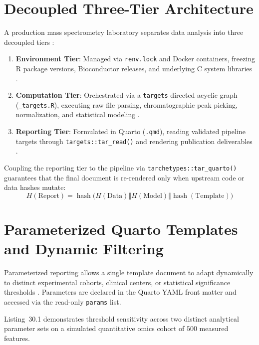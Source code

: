 \documentclass[11pt,twoside,openright]{book}
\begin{document}
\FloatBarrier
\section{Decoupled Three-Tier Architecture}
\label{sec:three_tier}

A production mass spectrometry laboratory separates data analysis into three decoupled tiers \cite{peng2011reproducible, landau2021targets}:
\begin{enumerate}
\item \textbf{Environment Tier}: Managed via \texttt{renv.lock} and Docker containers, freezing R package versions, Bioconductor releases, and underlying C system libraries \cite{ushey2024renv}.
\item \textbf{Computation Tier}: Orchestrated via a \texttt{targets} directed acyclic graph (\texttt{\_targets.R}), executing raw file parsing, chromatographic peak picking, normalization, and statistical modeling \cite{landau2021targets}.
\item \textbf{Reporting Tier}: Formulated in Quarto (\texttt{.qmd}), reading validated pipeline targets through \texttt{targets::}\allowbreak\texttt{tar\_read()} and rendering publication deliverables \cite{allaire2022quarto}.
\end{enumerate}

Coupling the reporting tier to the pipeline via \texttt{tarchetypes::tar\_quarto()} guarantees that the final document is re-rendered only when upstream code or data hashes mutate:
\begin{equation}
H(\text{Report}) = \operatorname{hash}\Big( H(\text{Data}) \mathbin{\Vert} H(\text{Model}) \mathbin{\Vert} \operatorname{hash}(\text{Template}) \Big)
\label{eq:report_hash}
\end{equation}

\FloatBarrier
\section{Parameterized Quarto Templates and Dynamic Filtering}
\label{sec:parameterized_quarto}

Parameterized reporting allows a single template document to adapt dynamically to distinct experimental cohorts, clinical centers, or statistical significance thresholds \cite{allaire2022quarto}. Parameters are declared in the Quarto YAML front matter and accessed via the read-only \texttt{params} list.

Listing~30.1 demonstrates threshold sensitivity across two distinct analytical parameter sets on a simulated quantitative omics cohort of $500$ measured features.
\end{document}
